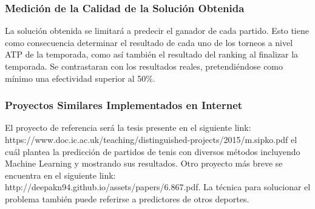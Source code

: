 \documentclass[11pt]{article}
\begin{document}
\subsubsection{Medición de la Calidad de la Solución
Obtenida}\label{mediciuxf3n-de-la-calidad-de-la-soluciuxf3n-obtenida}

La solución obtenida se limitará a predecir el ganador de cada partido.
Esto tiene como consecuencia determinar el resultado de cada uno de los
torneos a nivel ATP de la temporada, como así también el resultado del
ranking al finalizar la temporada. Se contrastaran con los resultados
reales, pretendiéndose como mínimo una efectividad superior al 50\%.

\subsubsection{Proyectos Similares Implementados en
Internet}\label{proyectos-similares-implementados-en-internet}

El proyecto de referencia será la tesis presente en el siguiente link:
https://www.doc.ic.ac.uk/teaching/distinguished-projects/2015/m.sipko.pdf
el cuál plantea la predicción de partidos de tenis con diversos métodos
incluyendo Machine Learning y mostrando sus resultados. Otro proyecto
más breve se encuentra en el siguiente link:
http://deepakn94.github.io/assets/papers/6.867.pdf. La técnica para
solucionar el problema también puede referirse a predictores de otros
deportes.


    
    
    
    
\end{document}
